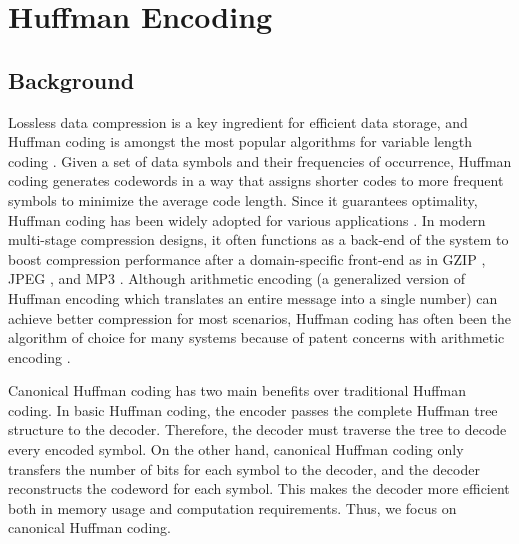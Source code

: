 
\chapter{Huffman Encoding}
\glsresetall
\label{chapter:huffman}

\section{Background}

Lossless data compression is a key ingredient for efficient data storage, and Huffman coding is amongst the most popular algorithms for variable length coding \cite{huffman1952method}. Given a set of data symbols and their frequencies of occurrence, Huffman coding generates codewords in a way that assigns shorter codes to more frequent symbols to minimize the average code length. Since it guarantees optimality, Huffman coding has been widely adopted for various applications \cite{flannery1992numerical}. In modern multi-stage compression designs, it often functions as a back-end of the system to boost compression performance after a domain-specific front-end as in GZIP \cite{deutsch1996deflate}, JPEG \cite{pennebaker1992jpeg}, and MP3 \cite{sherigar2004huffman}. Although arithmetic encoding \cite{witten1987arithmetic}  (a generalized version of Huffman encoding which translates an entire message into a single number) can achieve better compression for most scenarios, Huffman coding has often been the algorithm of choice for many systems because of patent concerns with arithmetic encoding \cite{langdon1990arithmetic}.

Canonical Huffman coding has two main benefits over traditional Huffman coding. In basic Huffman coding, the encoder passes the complete Huffman tree structure to the decoder. Therefore, the decoder must traverse the tree to decode every encoded symbol. On the other hand, canonical Huffman coding only transfers the number of bits for each symbol to the decoder, and the decoder reconstructs the codeword for each symbol. This makes the decoder more efficient both in memory usage and computation requirements. Thus, we focus on canonical Huffman coding.

